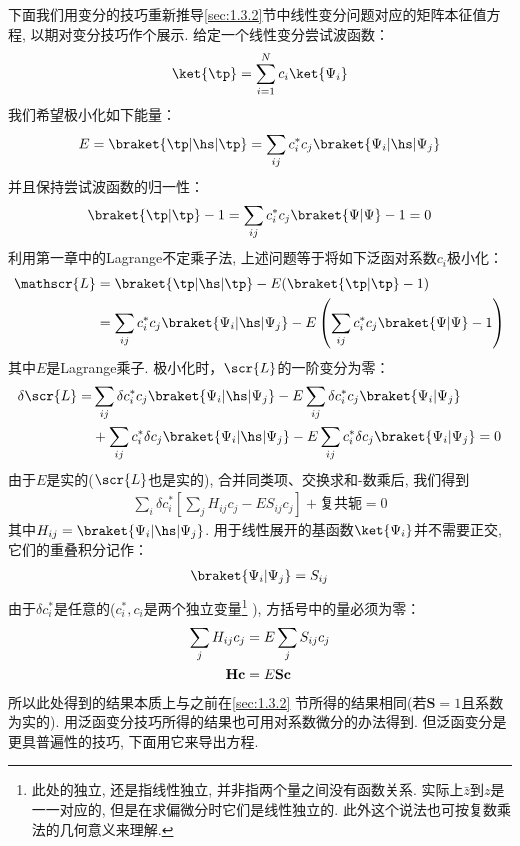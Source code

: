 下面我们用变分的技巧重新推导\autoref{sec:1.3.2}节中线性变分问题对应的矩阵本征值方程, 
以期对变分技巧作个展示. 
给定一个线性变分尝试波函数：
\begin{align}
	\ket{\tp} = \sum_{i=1}^{N}c_i\ket{\Psi_i}
\end{align}
我们希望极小化如下能量：
\begin{align}
	E = \braket{\tp|\hs|\tp} = \sum_{ij} c_i^*c_j\braket{\Psi_i|\hs|\Psi_j}
\end{align}
并且保持尝试波函数的归一性：
\begin{align}
	\braket{\tp|\tp} - 1 = \sum_{ij}c_i^*c_j \braket{\Psi|\Psi} - 1 = 0
\end{align}
利用第一章中的Lagrange不定乘子法, 
上述问题等于将如下泛函对系数$c_i$极小化：
\begin{align}
	\mathscr{L} & = \braket{\tp|\hs|\tp} - E(\braket{\tp|\tp}-1) \notag\\
	& = \sum_{ij}c_i^*c_j\braket{\Psi_i|\hs|\Psi_j} - E\left( \sum_{ij}c_i^*c_j \braket{\Psi|\Psi} - 1 \right)
\end{align}
其中$E$是Lagrange乘子. 
极小化时，$\scr{L}$的一阶变分为零：
\begin{align}
	\delta\scr{L} = & \sum_{ij}\delta c_i^*c_j\braket{\Psi_i|\hs|\Psi_j} - E\sum_{ij}\delta c_i^*c_j\braket{\Psi_i|\Psi_j} \notag \\
	& +  \sum_{ij}c_i^*\delta c_j\braket{\Psi_i|\hs|\Psi_j} - E\sum_{ij}c_i^*\delta c_j\braket{\Psi_i|\Psi_j} = 0
\end{align}
由于$E$是实的($\scr{L}$也是实的), 
合并同类项、交换求和-数乘后, 
我们得到
\begin{align}
	\sum_i\delta c_i^*\left[ \sum_j H_{ij}c_j - ES_{ij}c_j \right] + \text{复共轭} = 0
\end{align}
其中$H_{ij} = \braket{\Psi_i|\hs|\Psi_j}$. 
用于线性展开的基函数$\ket{\Psi_i}$并不需要正交, 
它们的重叠积分记作：
\begin{align}
	\braket{\Psi_i|\Psi_j} = S_{ij}
\end{align}
由于$\delta c_i^*$是任意的($c_i^*,c_i$是两个独立变量\footnote{
	此处的独立, 还是指线性独立, 并非指两个量之间没有函数关系. 
	实际上$\bar{z}$到$z$是一一对应的, 但是在求偏微分时它们是线性独立的. 
	此外这个说法也可按复数乘法的几何意义来理解.}
), 方括号中的量必须为零：
\begin{align}
	\sum_j H_{ij}c_j & = E \sum_j S_{ij}c_j \notag\\
	\mathbf{Hc} & = E\mathbf{Sc}
\end{align}
所以此处得到的结果本质上与之前在\autoref{sec:1.3.2} 节所得的结果相同(若$\mathbf{S}=1$且系数为实的). 
用泛函变分技巧所得的结果也可用对系数微分的办法得到. 
但泛函变分是更具普遍性的技巧, 
下面用它来导出\hft 方程. 


